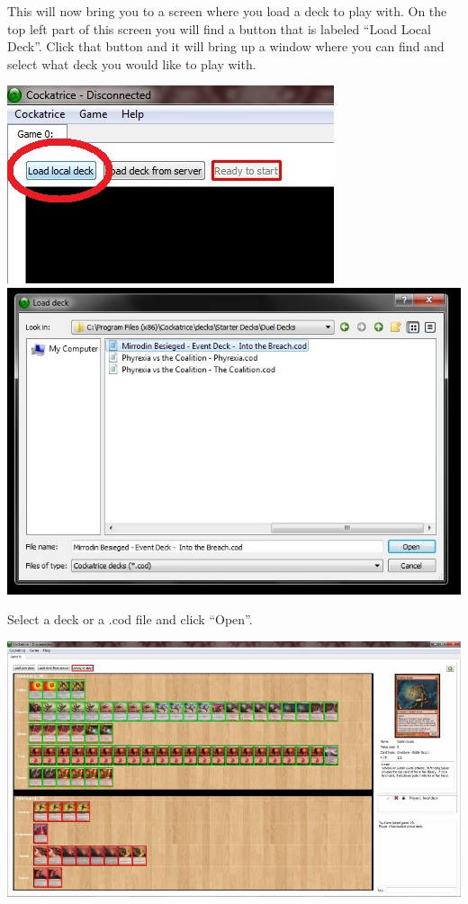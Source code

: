 \documentclass[a4paper]{scrbook}
\begin{document}
This will now bring you to a screen where you load a deck to play with. On the top left part of this screen you will find a button that is labeled “Load Local Deck”. Click that button and it will bring up a window where you can find and select what deck you would like to play with.

\begin{center}
\includegraphics{pics/fetchf0d2}
\includegraphics[scale=0.8]{pics/fetch55a7}
\end{center}
Select a deck or a .cod file and click “Open”.

\begin{center}
\includegraphics[scale=0.4]{pics/fetch9b89}
\end{center}
\end{document}
